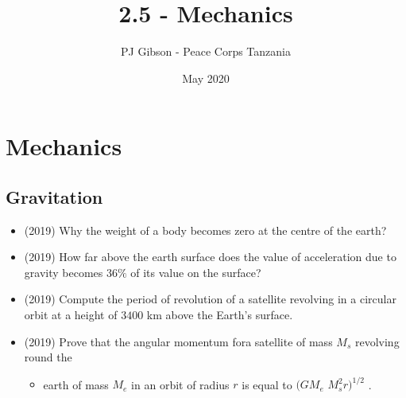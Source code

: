\documentclass{article}
\title{2.5 - Mechanics}
\author{PJ Gibson - Peace Corps Tanzania}
\date{May 2020}
\begin{document}
\maketitle


\section{Mechanics}

\subsection{Gravitation}
\begin{itemize}
\item (2019)  Why the weight of a body becomes zero at the centre of the earth? 
\item (2019)  How far above the earth surface does the value of acceleration due to gravity becomes $ 36\%$ of its value on the surface? 
\item (2019)  Compute the period of revolution of a satellite revolving in a circular orbit at a height of $ 3400$ km above the Earth’s surface. 
\item (2019)  Prove that the angular momentum fora satellite of mass $ M_{s}$ revolving round the
 \begin{itemize}
\item earth of mass $ M_{e}$ in an orbit of radius $ r$ is equal to $ (G M_{e}$  $ M_{s}^{2}r)^{1/2}$ .
\end{itemize}
\end{itemize}
\end{document}

